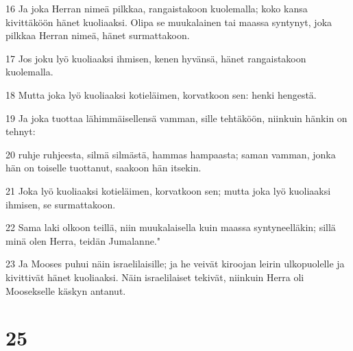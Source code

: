 \par 16 Ja joka Herran nimeä pilkkaa, rangaistakoon kuolemalla; koko kansa kivittäköön hänet kuoliaaksi. Olipa se muukalainen tai maassa syntynyt, joka pilkkaa Herran nimeä, hänet surmattakoon.
\par 17 Jos joku lyö kuoliaaksi ihmisen, kenen hyvänsä, hänet rangaistakoon kuolemalla.
\par 18 Mutta joka lyö kuoliaaksi kotieläimen, korvatkoon sen: henki hengestä.
\par 19 Ja joka tuottaa lähimmäisellensä vamman, sille tehtäköön, niinkuin hänkin on tehnyt:
\par 20 ruhje ruhjeesta, silmä silmästä, hammas hampaasta; saman vamman, jonka hän on toiselle tuottanut, saakoon hän itsekin.
\par 21 Joka lyö kuoliaaksi kotieläimen, korvatkoon sen; mutta joka lyö kuoliaaksi ihmisen, se surmattakoon.
\par 22 Sama laki olkoon teillä, niin muukalaisella kuin maassa syntyneelläkin; sillä minä olen Herra, teidän Jumalanne."
\par 23 Ja Mooses puhui näin israelilaisille; ja he veivät kiroojan leirin ulkopuolelle ja kivittivät hänet kuoliaaksi. Näin israelilaiset tekivät, niinkuin Herra oli Moosekselle käskyn antanut.

\chapter{25}


